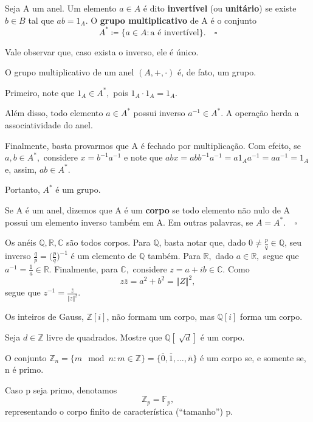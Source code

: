 \documentclass[algebraII_notes.tex]{subfiles}
\begin{document}
\begin{def*}
	Seja A um anel. Um elemento \(a\in A\) é dito \textbf{invertível} (ou \textbf{unitário}) se existe \(b\in B\) tal que \(ab = 1_{A}.\) O \textbf{grupo multiplicativo} de A
	é o conjunto
	\[
		A^{*}\coloneqq \{a\in A: \text{a é invertível}\}.\quad\square
	\]
\end{def*}
Vale observar que, caso exista o inverso, ele é único.
\begin{prop*}
	O grupo multiplicativo de um anel \((A, +, \cdot )\) é, de fato, um grupo.
\end{prop*}
\begin{proof*}
	Primeiro, note que \(1_{A}\in A^{*},\) pois \(1_{A} \cdot 1_{A} = 1_{A}.\)

	Além disso, todo elemento \(a\in A^{*}\) possui inverso \(a^{-1}\in A^{*}.\) A operação herda a associatividade do anel.

	Finalmente, basta provarmos que A é fechado por multiplicação. Com efeito, se \(a, b\in A^{*},\) considere \(x = b^{-1}a^{-1}\) e note que \(abx = abb^{-1}a^{-1} =
	a 1_{A} a^{-1} = aa^{-1} = 1_{A}\) e, assim, \(ab\in A^{*}.\)

	Portanto, \(A^{*}\) é um grupo. \qedsymbol
\end{proof*}
\begin{def*}
	Se A é um anel, dizemos que A é um \textbf{corpo} se todo elemento não nulo de A possui um elemento inverso também em A. Em outras palavras, se \(A = A^{*}.\quad\square\)
\end{def*}
\begin{example}
	Os anéis \(\mathbb{Q}, \mathbb{R}, \mathbb{C}\) são todos corpos. Para \(\mathbb{Q}\), basta notar que, dado \(0\neq \frac{p}{q}\in \mathbb{Q}\), seu inverso
	\(\frac{q}{p} = \biggl(\frac{p}{q}\biggr)^{-1}\) é um elemento de \(\mathbb{Q}\) também. Para \(\mathbb{R},\) dado \(a\in \mathbb{R},\) segue que \(a^{-1} = \frac{1}{a}\in \mathbb{R}\).
	Finalmente, para \(\mathbb{C},\) considere \(z = a + ib\in \mathbb{C}.\) Como
	\[
		z\overline{z} = a^{2} + b^{2} = \Vert Z \Vert^{2},
	\]
	segue que \(z^{-1}=\frac{\overline{z}}{\Vert z \Vert^{2}}.\)

	Os inteiros de Gauss, \(\mathbb{Z}[i]\), não formam um corpo, mas \(\mathbb{Q}[i]\) forma um corpo.
\end{example}
\begin{example}[Exercício]
	Seja \(d\in \mathbb{Z}\) livre de quadrados. Mostre que \(\mathbb{Q}[\sqrt[]{d}]\) é um corpo.
\end{example}
\begin{theorem*}
	O conjunto \(\mathbb{Z}_{n} = \{m\mod n: m\in \mathbb{Z}\} = \{\overline{0}, \overline{1}, \dotsc , \overline{n}\}\) é um corpo se, e somente se, n é primo.
\end{theorem*}
Caso p seja primo, denotamos
\[
	\mathbb{Z}_{p} = \mathbb{F}_{p},
\]
representando o corpo finito de característica (``tamanho'') p.
\end{document}
